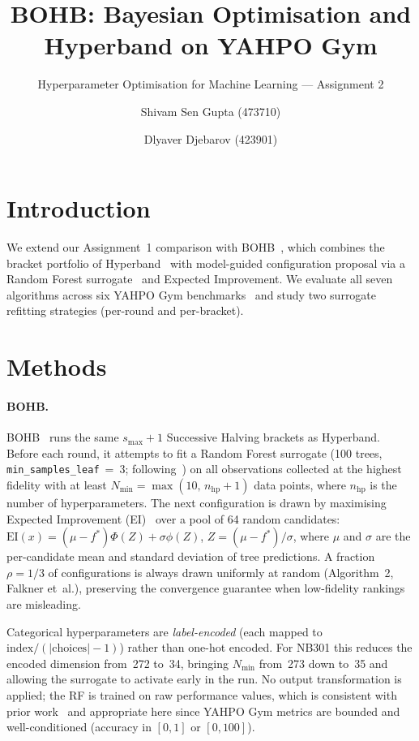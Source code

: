 \documentclass{AIM_report}
\title{BOHB: Bayesian Optimisation and Hyperband on YAHPO Gym}
\subtitle{Hyperparameter Optimisation for Machine Learning --- Assignment 2}
\author{Shivam Sen Gupta (473710) \and Dlyaver Djebarov (423901)}
\institute{RWTH Aachen University, Germany\\
\email{shivam.sengupta@rwth-aachen.de, dlyaver.djebarov@rwth-aachen.de}}
\begin{document}
\maketitle

\section{Introduction}

We extend our Assignment~1 comparison with BOHB~\cite{falkner2018bohb},
which combines the bracket portfolio of Hyperband~\cite{li2018hyperband}
with model-guided configuration proposal via a Random Forest
surrogate~\cite{hutter2011smac} and Expected Improvement.
We evaluate all seven algorithms across six YAHPO Gym
benchmarks~\cite{pfisterer2022yahpo} and study two surrogate
refitting strategies (per-round and per-bracket).

\section{Methods}

\paragraph{BOHB.}
BOHB~\cite{falkner2018bohb} runs the same $s_{\max}{+}1$ Successive
Halving brackets as Hyperband.
Before each round, it attempts to fit a Random Forest surrogate
(100 trees, \texttt{min\_samples\_leaf}~=~3;
following~\cite{hutter2011smac}) on all observations collected at
the highest fidelity with at least $N_{\min}{=}\max(10,\,n_\text{hp}+1)$
data points, where $n_\text{hp}$ is the number of hyperparameters.
The next configuration is drawn by maximising Expected Improvement
(EI)~\cite{snoek2012practical} over a pool of 64 random candidates:
$\text{EI}(x)=(\mu{-}f^*)\Phi(Z)+\sigma\phi(Z)$,
$Z{=}(\mu{-}f^*)/\sigma$, where $\mu$ and $\sigma$ are the
per-candidate mean and standard deviation of tree predictions.
A fraction $\rho{=}1/3$ of configurations is always drawn uniformly
at random (Algorithm~2, Falkner et~al.), preserving the convergence
guarantee when low-fidelity rankings are misleading.

Categorical hyperparameters are \emph{label-encoded}
(each mapped to $\mathrm{index}/(|\mathrm{choices}|-1)$) rather than
one-hot encoded.
For NB301 this reduces the encoded dimension from~272 to~34, bringing
$N_{\min}$ from~273 down to~35 and allowing the surrogate to activate
early in the run.
No output transformation is applied; the RF is trained on raw
performance values, which is consistent with prior work~\cite{falkner2018bohb}
and appropriate here since YAHPO Gym metrics are bounded and
well-conditioned (accuracy in $[0,1]$ or $[0,100]$).
\end{document}
